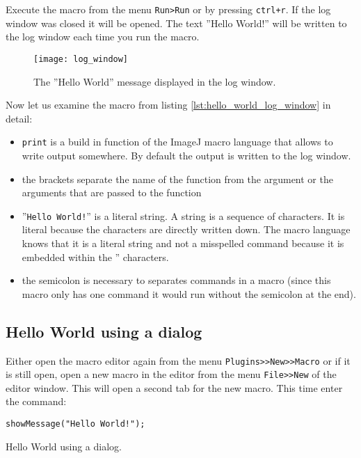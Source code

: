 Execute the macro from the menu {\tt Run>Run} or by pressing {\tt ctrl+r}. If the log window was closed it will be opened. The text ''Hello World!'' will be written to the log window each time you run the macro. 

\begin{figure}[h!]
  \centering
    \texttt{[image: log\_window]}
    \caption[A message in the log window]{The ''Hello World'' message displayed in the log window.}
    \label{log_window}
\end{figure}

Now let us examine the macro from listing \ref{lst:hello_world_log_window} in detail:
\begin{itemize}
\item {\tt print} is a build in function of the ImageJ macro language that allows to write output somewhere. By default the output is written to the log window.
\item the brackets separate the name of the function from the argument or the arguments that are passed to the function
\item ''{\tt Hello World!}'' is a literal string. A string is a sequence of characters. It is literal because the characters are directly written down. The macro language knows that it is a literal string and not a misspelled command because it is embedded within the '' characters.
\item the semicolon is necessary to separates commands in a macro (since this macro only has one command it would run without the semicolon at the end).
\end{itemize}

\subsection{Hello World using a dialog}
	
Either open the macro editor again from the menu {\tt Plugins>>New>>Macro} or if it is still open, open a new macro in the editor from the menu {\tt File>>New} of the editor window. This will open a second tab for the new macro. This time enter the command:

\begin{listing}[H]
\begin{verbatim}
showMessage("Hello World!");
\end{verbatim}
\caption{Hello World using a dialog.}
\label{lst:hello_world_dialog}
\end{listing}


